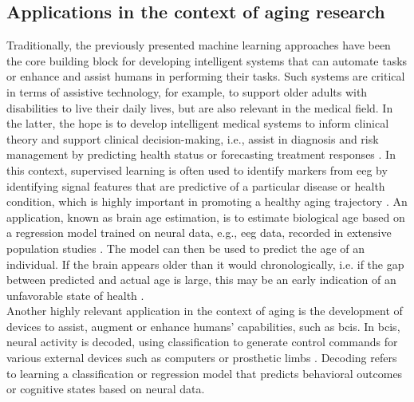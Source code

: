\subsection{Applications in the context of aging research}
\label{theory:ml:applications_aging}
Traditionally, the previously presented machine learning approaches have been the core building block for developing intelligent systems that can automate tasks or enhance and assist humans in performing their tasks. Such systems are critical in terms of assistive technology, for example, to support older adults with disabilities to live their daily lives, but are also relevant in the medical field. In the latter, the hope is to develop intelligent medical systems to inform clinical theory and support clinical decision-making, i.e., assist in diagnosis and risk management by predicting health status or forecasting treatment responses \cite{Woo2017}. In this context, supervised learning is often used to identify markers from \gls{eeg} by identifying signal features that are predictive of a particular disease or health condition, which is highly important in promoting a healthy aging trajectory \cite{Babiloni2021,Mei2021}. An application, known as brain age estimation, is to estimate biological age based on a regression model trained on neural data, e.g., \gls{eeg} data, recorded in extensive population studies \cite{Engemann2022}. The model can then be used to predict the age of an individual. If the brain appears older than it would chronologically, i.e. if the gap between predicted and actual age is large, this may be an early indication of an unfavorable state of health \cite{Gonneaud2021}.\\
Another highly relevant application in the context of aging is the development of devices to assist, augment or enhance humans' capabilities, such as \glspl{bci}. In \glspl{bci}, neural activity is decoded, using classification to generate control commands for various external devices such as computers or prosthetic limbs \cite{Saha2021, Anumanchipalli2019}. Decoding refers to learning a classification or regression model that predicts behavioral outcomes or cognitive states based on neural data. \\
